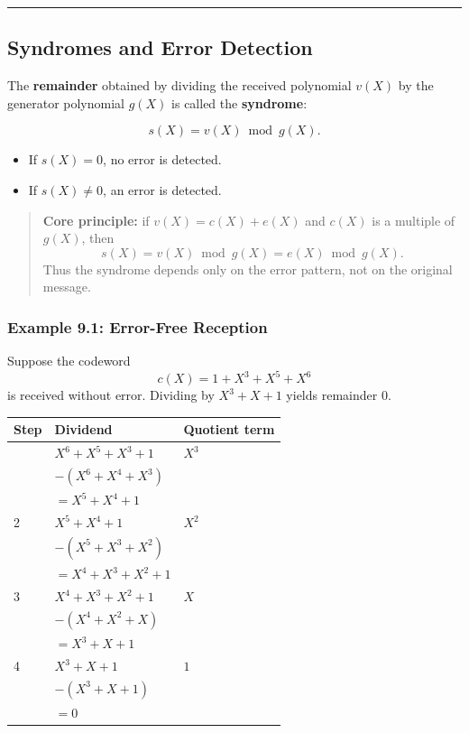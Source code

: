 \documentclass[
]{article}
\providecommand{\tightlist}{%
  \setlength{\itemsep}{0pt}\setlength{\parskip}{0pt}}
\begin{document}
\begin{center}\rule{0.5\linewidth}{0.5pt}\end{center}

\subsection{Syndromes and Error Detection}\label{what-is-the-syndrome-and-how-is-error-detection-performed}

The \textbf{remainder} obtained by dividing the received polynomial
\(v(X)\) by the generator polynomial \(g(X)\) is called the
\textbf{syndrome}:

\[s(X)=v(X) \bmod g(X).\]

\begin{itemize}
\tightlist
\item
  If \(s(X)=0\), no error is detected.
\item
  If \(s(X)\neq 0\), an error is detected.
\end{itemize}

\begin{quote}
\textbf{Core principle:} if \(v(X)=c(X)+e(X)\) and \(c(X)\) is a
multiple of \(g(X)\), then \[s(X)=v(X) \bmod g(X)=e(X) \bmod g(X).\]
Thus the syndrome depends only on the error pattern, not on the original
message.
\end{quote}

\subsubsection{Example 9.1: Error-Free
Reception}\label{example-9.1-error-free-reception}

Suppose the codeword \[c(X)=1+X^3+X^5+X^6\] is received without error.
Dividing by \(X^3+X+1\) yields remainder 0.

\begin{longtable}[]{@{}lll@{}}
\toprule\noalign{}
Step & Dividend & Quotient term \\
\midrule\noalign{}
\endhead
\bottomrule\noalign{}
\endlastfoot
1 & \(X^6 + X^5 + X^3 + 1\) & \(X^3\) \\
& \(-(X^6 + X^4 + X^3)\) & \\
& \(= X^5 + X^4 + 1\) & \\
2 & \(X^5 + X^4 + 1\) & \(X^2\) \\
& \(-(X^5 + X^3 + X^2)\) & \\
& \(= X^4 + X^3 + X^2 + 1\) & \\
3 & \(X^4 + X^3 + X^2 + 1\) & \(X\) \\
& \(-(X^4 + X^2 + X)\) & \\
& \(= X^3 + X + 1\) & \\
4 & \(X^3 + X + 1\) & \(1\) \\
& \(-(X^3 + X + 1)\) & \\
& \(= 0\) & \\
\end{longtable}
\end{document}
